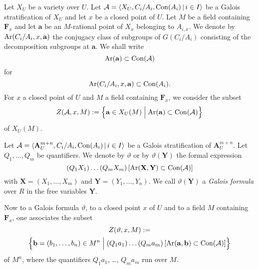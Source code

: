 \documentclass[english,12pt]{amsart}
\def\aa{{\mathbf a}}\def\bb{{\mathbf b}}
\def\AA{{\mathbf A}}
\def\FF{{\mathbf F}}
\def\XX{{\mathbf X}}
\def\YY{{\mathbf Y}}
\def\cA{{\mathcal A}}
\theoremstyle{definition}
\theoremstyle{remark}
\theoremstyle{plain}
\numberwithin{equation}{subsection}
\def\AA{{\mathbf A}}
\def\FF{{\mathbf F}}
\def\XX{{\mathbf X}}
\def\YY{{\mathbf Y}}
\def\cA{{\mathcal A}}
\begin{document}
Let $X_{U}$ be a variety over $U$.
Let $\cA 
= \langle X_{U}, C_{i} / A_{i}, {\rm Con} (A_{i}) \, \vert \,
i \in I \rangle$
be a Galois stratification of $X_{U}$ and let
$x$ be a closed point of $U$.
Let $M$ be a field containing $\FF_{x}$ and 
let $\aa$
be  an $M$-rational point of $X_{x}$ belonging
to $A_{i, x}$. We denote by ${\rm Ar} (C_{i} / A_{i}, x ,\aa)$
the conjugacy class of subgroups of $G (C_{i}  / A_{i})$
consisting of  the  decomposition subgroups at $\aa$. We shall
write
$$
{\rm Ar} (\aa) \subset {\rm Con} (\cA)
$$
for 
$${\rm Ar} (C_{i} / A_{i}, x ,\aa) \subset {\rm Con} (A_{i}).
$$
For $x$ a  closed point of $U$ and
$M$ a field containing $\FF_{x}$, we consider the subset
$$
Z (\cA, x, M) :=
\Bigl\{\aa \in X_{U} (M)
\Bigm \vert {\rm Ar} (\aa) \subset
{\rm Con} (\cA)
\Bigr\}
$$
of
$X_{U}(M)$.



Let
$\cA 
= \langle \AA^{m + n}_{U}, C_{i} / A_{i}, {\rm Con} (A_{i})
\, \vert \, i \in I \rangle$
be a Galois stratification of $\AA^{m + n}_{U}$.
Let $Q_{1}, \ldots, Q_{m}$ be quantifiers.
We denote by $\vartheta$  or by $\vartheta (\YY)$ the formal expression
$$
(Q_{1} X_{1}) \ldots (Q_{m} X_{m}) \, [{\rm Ar} (\XX, \YY) \subset
{\rm Con} (\cA)]
$$
with $\XX = (X_{1}, \ldots, X_{m})$ and
$\YY = (Y_{1}, \ldots, Y_{n})$. We call $\vartheta (\YY)$
a {\it Galois formula} over $R$ in the free variables $\YY$. 



Now to a Galois formula $\vartheta$, to a 
closed point $x$ of $U$ and to a field $M$ containing $\FF_{x}$,
one associates the subset
\begin{multline*}
Z (\vartheta, x, M) :=\\
\Bigl\{\bb = (b_{1}, \ldots, b_{n}) \in M^n
\Bigm \vert
(Q_{1} a_{1}) \ldots (Q_{m} a_{m}) \, [{\rm Ar} (\aa, \bb) \subset
{\rm Con} (\cA)]
\Bigr\}
\end{multline*}
of
$M^n$, where the quantifiers $Q_{1} a_{1}$, \dots, $Q_{m} a_{m}$ run
over $M$.
\end{document}
